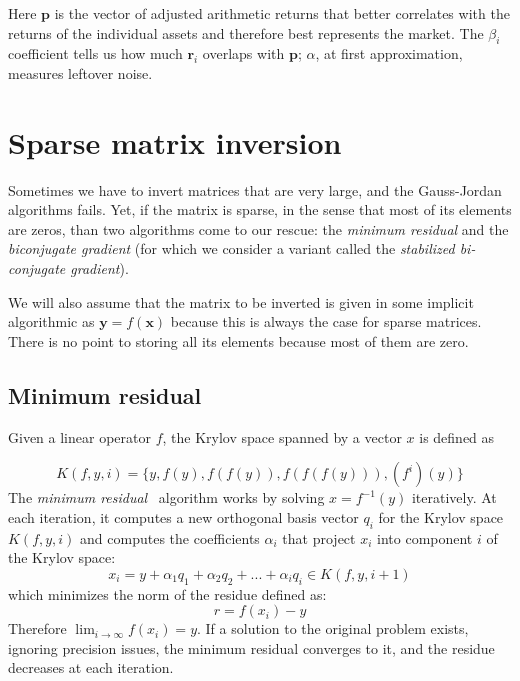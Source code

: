 \documentclass[justified,sixbynine]{tufte-book}
\theoremstyle{plain}%
\theoremstyle{definition}
\theoremstyle{remark}
\begin{document}
\begin{fullwidth}
Here $\mathbf{p}$ is the vector of adjusted arithmetic returns that better correlates with the returns of the individual assets and therefore best represents the market. The $\beta_i$ coefficient tells us how much $\mathbf{r}_i$ overlaps with $\mathbf{p}$; $\alpha$, at first approximation, measures leftover noise.

\goodbreak\section{Sparse matrix inversion}


Sometimes we have to invert matrices that are very large, and the Gauss-Jordan algorithms fails. Yet, if the matrix is sparse, in the sense that most of its elements are zeros, than two algorithms come to our rescue: the {\it minimum residual} and the {\it biconjugate gradient} (for which we consider a variant called the {\it stabilized bi-conjugate gradient}).

We will also assume that the matrix to be inverted is given in some implicit algorithmic as $\mathbf{y}=f(\mathbf{x})$ because this is always the case for sparse matrices. There is no point to storing all its elements because most of them are zero.

\goodbreak\subsection{Minimum residual}


Given a linear operator $f$, the Krylov space spanned by a vector $x$ is defined as

\begin{equation}
K(f,y,i) = \{y, f(y), f(f(y)), f(f(f(y))), (f^i)(y)\}
\end{equation}
The {\it minimum residual}~\cite{minres} algorithm works by solving $x=f^{-1}(y)$ iteratively. At each iteration, it computes a new orthogonal basis vector $q_i$ for the Krylov space $K(f,y,i)$ and computes the coefficients $\alpha_i$ that project $x_i$ into component $i$ of the Krylov space:
\begin{equation}
x_i = y + \alpha_1 q_1 + \alpha_2 q_2 + ... + \alpha_i q_i \in K(f,y,i+1)
\end{equation}
which minimizes the norm of the residue defined as:
\begin{equation}
r = f(x_i) - y
\end{equation}
Therefore $\lim_{i\rightarrow\infty} f(x_i) = y$.
If a solution to the original problem exists, ignoring precision issues, the minimum residual converges to it, and the residue decreases at each iteration.


\end{fullwidth}
\end{document}
